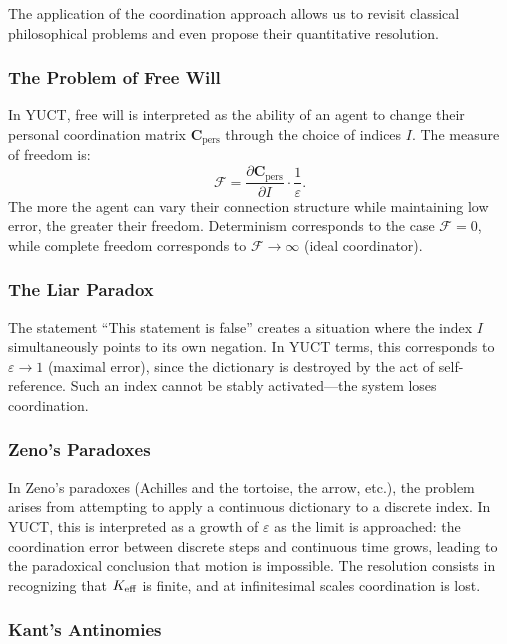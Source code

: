 \documentclass[12pt,a4paper]{article}
\newcommand{\eps}{\varepsilon}
\newcommand{\Cpers}{\mathbf{C}_{\text{pers}}}
\begin{document}
	The application of the coordination approach allows us to revisit classical philosophical problems and even propose their quantitative resolution.
	
	\subsubsection{The Problem of Free Will}
	
	In YUCT, free will is interpreted as the ability of an agent to change their personal coordination matrix \(\Cpers\) through the choice of indices \(I\). The measure of freedom is:
	\[
	\mathcal{F} = \frac{\partial \Cpers}{\partial I} \cdot \frac{1}{\eps}.
	\]
	The more the agent can vary their connection structure while maintaining low error, the greater their freedom. Determinism corresponds to the case \(\mathcal{F} = 0\), while complete freedom corresponds to \(\mathcal{F} \to \infty\) (ideal coordinator).
	
	\subsubsection{The Liar Paradox}
	
	The statement ``This statement is false'' creates a situation where the index \(I\) simultaneously points to its own negation. In YUCT terms, this corresponds to \(\eps \to 1\) (maximal error), since the dictionary is destroyed by the act of self-reference. Such an index cannot be stably activated—the system loses coordination.
	
	\subsubsection{Zeno's Paradoxes}
	
	In Zeno's paradoxes (Achilles and the tortoise, the arrow, etc.), the problem arises from attempting to apply a continuous dictionary to a discrete index. In YUCT, this is interpreted as a growth of \(\eps\) as the limit is approached: the coordination error between discrete steps and continuous time grows, leading to the paradoxical conclusion that motion is impossible. The resolution consists in recognizing that \(\Keff\) is finite, and at infinitesimal scales coordination is lost.
	
	\subsubsection{Kant's Antinomies}
	
\end{document}
